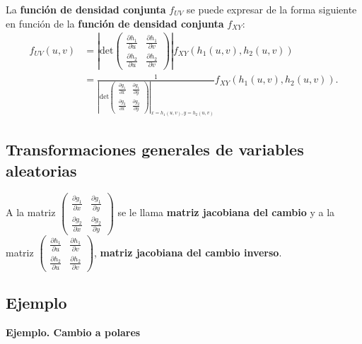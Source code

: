\documentclass[]{book}
\begin{document}
La \textbf{función de densidad conjunta} \(f_{UV}\) se puede expresar de la forma siguiente en función de la \textbf{función de densidad conjunta} \(f_{XY}\):
\[
\begin{array}{rl}
f_{UV}(u,v) & =\left|\mathrm{det}\begin{pmatrix}\frac{\partial h_1}{\partial u} & \frac{\partial h_1}{\partial v}\\ \frac{\partial h_2}{\partial u} & \frac{\partial h_2}{\partial v}\end{pmatrix}\right|f_{XY}(h_1(u,v),h_2(u,v))\\ & =\frac{1}{\left|\mathrm{det}\begin{pmatrix}\frac{\partial g_1}{\partial x} & \frac{\partial g_1}{\partial y}\\ \frac{\partial g_2}{\partial x} & \frac{\partial g_2}{\partial y}\end{pmatrix}\right|_{x=h_1(u,v),y=h_2(u,v)}}f_{XY}(h_1(u,v),h_2(u,v)).
\end{array}
\]

\hypertarget{transformaciones-generales-de-variables-aleatorias-2}{%
\subsection{Transformaciones generales de variables aleatorias}\label{transformaciones-generales-de-variables-aleatorias-2}}

A la matriz \(\begin{pmatrix}\frac{\partial g_1}{\partial x} & \frac{\partial g_1}{\partial y}\\ \frac{\partial g_2}{\partial x} & \frac{\partial g_2}{\partial y}\end{pmatrix}\) se le llama \textbf{matriz jacobiana del cambio} y a la matriz \(\begin{pmatrix}\frac{\partial h_1}{\partial u} & \frac{\partial h_1}{\partial v}\\ \frac{\partial h_2}{\partial u} & \frac{\partial h_2}{\partial v}\end{pmatrix}\), \textbf{matriz jacobiana del cambio inverso}.

\hypertarget{ejemplo-78}{%
\subsection{Ejemplo}\label{ejemplo-78}}

\textbf{Ejemplo. Cambio a polares}
\end{document}
